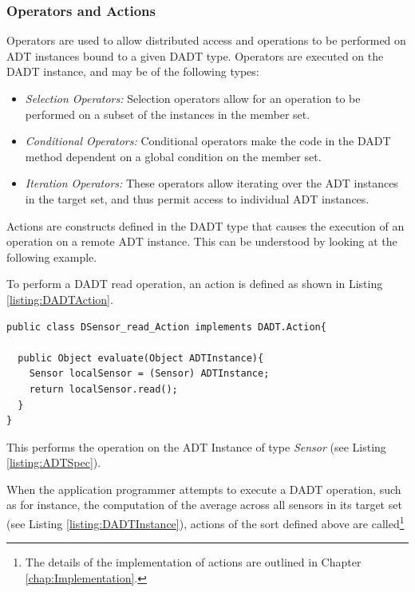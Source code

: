 \subsubsection{Operators and Actions} \label{subsubsec:OperatorsAndActions}

Operators are used to allow distributed access and operations to be performed on
ADT instances bound to a given DADT type. Operators are executed on the DADT
instance, and may be of the following types:

\begin{itemize}
  \item \emph{Selection Operators:} Selection operators allow for an operation
  to be performed on a subset of the instances in the member set.
  \item \emph{Conditional Operators:} Conditional operators make the code in the
  DADT method dependent on a global condition on the member set. 
  \item \emph{Iteration Operators:} These operators allow iterating over the ADT
  instances in the target set, and thus permit access to individual ADT instances.
\end{itemize}

Actions are constructs defined in the DADT type that causes the execution of an
operation on a remote ADT instance. This can be understood by looking at the
following example.

To perform a DADT read operation, an action is defined
as shown in Listing
\ref{listing:DADTAction}. 
 
\begin{lstlisting}[frame=trbl, basewidth={0.55em, 0.6em}, captionpos=b, 
basicstyle=\ttfamily\footnotesize, breaklines, caption = Defining a DADT action, label = listing:DADTAction ]  
public class DSensor_read_Action implements DADT.Action{

  public Object evaluate(Object ADTInstance){
	Sensor localSensor = (Sensor) ADTInstance;
    return localSensor.read();
  }
}
\end{lstlisting}

This performs the operation on the ADT Instance of type \emph{Sensor} (see
Listing \ref{listing:ADTSpec}).

When the application programmer attempts to execute a DADT operation, such as
for instance, the computation of the average
across all sensors in its target set (see Listing \ref{listing:DADTInstance}),
actions of the sort defined above are called\footnote{The details of the
implementation of actions are outlined in Chapter \ref{chap:Implementation}.} 

